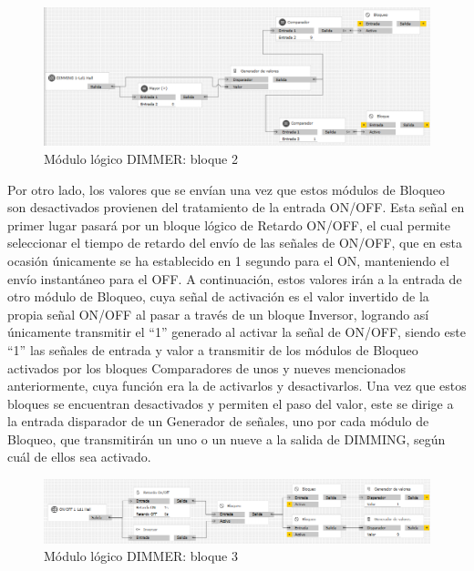  \begin{center}
\begin{figure}[H]
\includegraphics[width=1.15\textwidth]{figures/log_dimm_b2.png}   
\caption{Módulo lógico DIMMER: bloque 2}
\label{fig:log_dimm_b2}
\end{figure}
\end{center}
Por otro lado, los valores que se envían una vez que estos módulos de Bloqueo son desactivados provienen del tratamiento de la entrada ON/OFF. Esta señal en primer lugar pasará por un bloque lógico de Retardo ON/OFF, el cual permite seleccionar el tiempo de retardo del envío de las señales de ON/OFF, que en esta ocasión únicamente se ha establecido en 1 segundo para el ON, manteniendo el envío instantáneo para el OFF. A continuación, estos valores irán a la entrada de otro módulo de Bloqueo, cuya señal de activación es el valor invertido de la propia señal ON/OFF al pasar a través de un bloque Inversor, logrando así únicamente transmitir el “1” generado al activar la señal de ON/OFF, siendo este “1” las señales de entrada y valor a transmitir de los módulos de Bloqueo activados por los bloques Comparadores de unos y nueves mencionados anteriormente, cuya función era la de activarlos y desactivarlos. Una vez que estos bloques se encuentran desactivados y permiten el paso del valor, este se dirige a la entrada disparador de un Generador de señales, uno por cada módulo de Bloqueo, que transmitirán un uno o un nueve a la salida de DIMMING, según cuál de ellos sea activado.
 \begin{center}
\begin{figure}[H]
\includegraphics[width=1.15\textwidth]{figures/log_dimm_b3.png}   
\caption{Módulo lógico DIMMER: bloque 3}
\label{fig:log_dimm_b3}
\end{figure}
\end{center}
